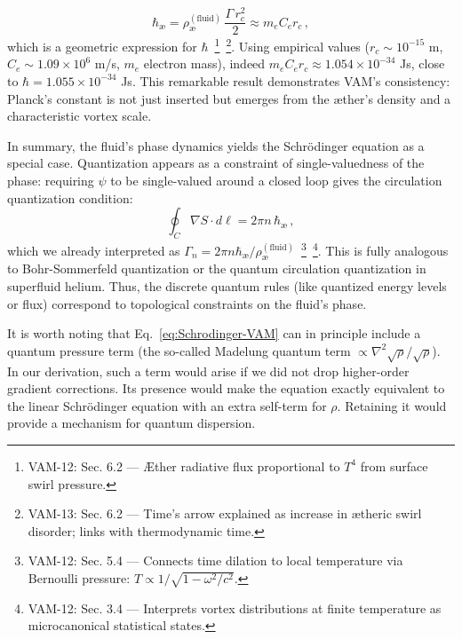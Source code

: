 \documentclass[a4paper,12pt]{article}
\begin{document}
    \begin{equation}
        \hbar_{\text{\ae}} = \rho_{\text{\ae}}^{(\text{fluid})}\,\frac{\Gamma\, r_c^2}{2} \approx m_e C_e r_c\,,
        \label{eq:hbar-geom}
    \end{equation}
    which is a geometric expression for $\hbar$~\footnote{VAM-12: Sec. 6.2 — Æther radiative flux proportional to $T^4$ from surface swirl pressure.}~\footnote{VAM-13: Sec. 6.2 — Time's arrow explained as increase in ætheric swirl disorder; links with thermodynamic time.}. Using empirical values ($r_c \sim 10^{-15}$ m, $C_e \sim 1.09\times 10^6$ m/s, $m_e$ electron mass), indeed $m_e C_e r_c \approx 1.054\times 10^{-34}$ Js, close to $\hbar = 1.055\times 10^{-34}$ Js. This remarkable result demonstrates VAM’s consistency: Planck’s constant is not just inserted but emerges from the æther’s density and a characteristic vortex scale.

    In summary, the fluid’s phase dynamics yields the Schrödinger equation as a special case. Quantization appears as a constraint of single-valuedness of the phase: requiring $\psi$ to be single-valued around a closed loop gives the circulation quantization condition:
    \begin{equation}
        \oint_C \nabla S \cdot d\ell = 2\pi n\,\hbar_{\text{\ae}}\,,
    \end{equation}
    which we already interpreted as $\Gamma_n = 2\pi n \hbar_{\text{\ae}}/\rho_{\text{\ae}}^{(\text{fluid})}$~\footnote{VAM-12: Sec. 5.4 — Connects time dilation to local temperature via Bernoulli pressure: $T \propto 1/\sqrt{1 - \omega^2/c^2}$.}~\footnote{VAM-12: Sec. 3.4 — Interprets vortex distributions at finite temperature as microcanonical statistical states.}. This is fully analogous to Bohr-Sommerfeld quantization or the quantum circulation quantization in superfluid helium. Thus, the discrete quantum rules (like quantized energy levels or flux) correspond to topological constraints on the fluid’s phase.

    It is worth noting that Eq.~\eqref{eq:Schrodinger-VAM} can in principle include a quantum pressure term (the so-called Madelung quantum term $\propto \nabla^2\sqrt{\rho}/\sqrt{\rho}$). In our derivation, such a term would arise if we did not drop higher-order gradient corrections. Its presence would make the equation exactly equivalent to the linear Schrödinger equation with an extra self-term for $\rho$. Retaining it would provide a mechanism for quantum dispersion.
\end{document}
